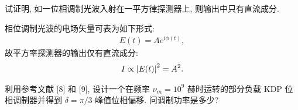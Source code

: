 \documentclass[twoside]{note}
\begin{document}
\begin{exe}
    试证明, 如一位相调制光波入射在一平方律探测器上, 则输出中只有直流成分.
\end{exe}
\begin{pf}
    相位调制光波的电场矢量可表为如下形式:
    \begin{align}
        E(t)=Ae^{i\phi(t)},
    \end{align}
    故平方率探测器的输出仅有直流成分:
    \begin{align}
        I\propto\left\lvert E(t)\right\rvert^2=A^2.
    \end{align}
\end{pf}

\begin{exe}
    利用参考文献 [8] 和 [9], 设计一个在频率 $\nu_m=10^9$ 赫时运转的部分负载 KDP 位相调制器并得到 $\delta=\pi/3$ 峰值位相偏移. 问调制功率是多少?
\end{exe}
\end{document}
